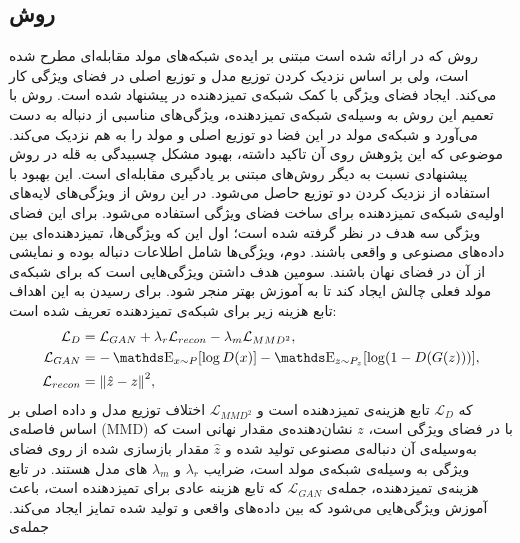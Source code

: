  \subsection{ روش }
روش
که در
\cite{Zhang2017TextGAN}
ارائه شده است مبتنی بر ایده‌ی شبکه‌های مولد مقابله‌ای مطرح شده است، ولی بر اساس نزدیک کردن توزیع مدل و توزیع اصلی در فضای ویژگی کار می‌کند. ایجاد فضای ویژگی با کمک شبکه‌ی تمیزدهنده در
 \cite{Salimans16ImprovedTech}
 پیشنهاد شده است. روش 
 با تعمیم این روش به وسیله‌ی شبکه‌ی تمیزدهنده، ویژگی‌های مناسبی از دنباله به دست می‌آورد و شبکه‌ی مولد در این فضا دو توزیع اصلی و مولد را به هم نزدیک می‌کند. موضوعی که این پژوهش روی آن تاکید داشته، بهبود مشکل چسبیدگی به قله در روش پیشنهادی نسبت به دیگر روش‌های مبتنی بر یادگیری مقابله‌ای  است. این بهبود با استفاده از نزدیک کردن 
 دو توزیع حاصل می‌شود.
 \newline
در این روش از ویژگی‌های لایه‌های اولیه‌ی شبکه‌ی تمیزدهنده برای ساخت فضای ویژگی استفاده می‌شود.
برای این فضای ویژگی سه هدف در نظر گرفته شده است؛ اول این که ویژگی‌ها، تمیزدهنده‌ای بین داد‌ه‌های مصنوعی و واقعی باشند. دوم، ویژگی‌ها شامل اطلاعات دنباله بوده و نمایشی از آن در فضای نهان باشند. سومین هدف داشتن ویژگی‌هایی است که برای شبکه‌ی مولد فعلی چالش ایجاد کند تا به آموزش بهتر منجر شود. برای رسیدن به این اهداف تابع هزینه زیر برای شبکه‌ی تمیزدهنده تعریف شده است:
\begin{equation}
\begin{split}
\mathcal{L}_D &= \mathcal{L}_{GAN} + \lambda_r \mathcal{L}_{recon} - \lambda_m \mathcal{L}_{MMD^2}, \\
\mathcal{L}_{GAN}  &= - \ME_{x \sim P} [\log D(x)] - \ME_{z \sim P_z} [\log (1-D(G(z)))], \\
\mathcal{L}_{recon}  &= {\Vert \hat{z} - z \Vert} ^2,
\end{split}
\end{equation}
که $\mathcal{L}_D$ تابع هزینه‌ی تمیزدهنده است و $\mathcal{L}_{MMD^2}$ اختلاف توزیع مدل و داده اصلی بر اساس فاصله‌ی
(MMD)
با  
در فضای ویژگی است،
 $z$
نشان‌دهنده‌ی مقدار نهانی است که به‌وسیله‌ی آن دنباله‌ی مصنوعی تولید شده و 
 $\hat{z}$
 مقدار بازسازی شده از روی فضای ویژگی به وسیله‌ی شبکه‌ی مولد است، ضرایب 
$\lambda_r$
و
$\lambda_m$
های مدل هستند. 
\newline
در تابع هزینه‌ی تمیزدهنده، جمله‌ی
$\mathcal{L}_{GAN}$
که تابع هزینه عادی برای تمیزدهنده است، باعث آموزش ویژگی‌هایی می‌شود که بین داده‌های واقعی و تولید شده تمایز ایجاد می‌کند. جمله‌ی
